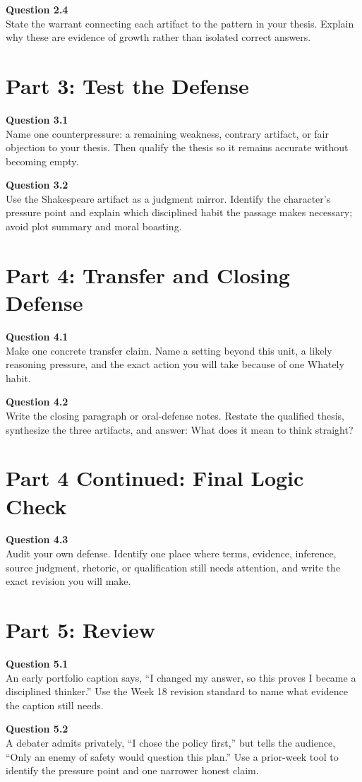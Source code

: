 \documentclass[12pt]{article}
\begin{document}
\textbf{Question 2.4}\\[-0.15em]
State the warrant connecting each artifact to the pattern in your thesis. Explain why these are evidence of growth rather than isolated correct answers.

\newpage
\section*{Part 3: Test the Defense}
\textbf{Question 3.1}\\[-0.15em]
Name one counterpressure: a remaining weakness, contrary artifact, or fair objection to your thesis. Then qualify the thesis so it remains accurate without becoming empty.

\textbf{Question 3.2}\\[-0.15em]
Use the Shakespeare artifact as a judgment mirror. Identify the character's pressure point and explain which disciplined habit the passage makes necessary; avoid plot summary and moral boasting.

\newpage
\section*{Part 4: Transfer and Closing Defense}
\textbf{Question 4.1}\\[-0.15em]
Make one concrete transfer claim. Name a setting beyond this unit, a likely reasoning pressure, and the exact action you will take because of one Whately habit.

\textbf{Question 4.2}\\[-0.15em]
Write the closing paragraph or oral-defense notes. Restate the qualified thesis, synthesize the three artifacts, and answer: What does it mean to think straight?

\newpage
\section*{Part 4 Continued: Final Logic Check}
\textbf{Question 4.3}\\[-0.15em]
Audit your own defense. Identify one place where terms, evidence, inference, source judgment, rhetoric, or qualification still needs attention, and write the exact revision you will make.

\newpage
\section*{Part 5: Review}
\textbf{Question 5.1}\\[-0.15em]
An early portfolio caption says, ``I changed my answer, so this proves I became a disciplined thinker.'' Use the Week 18 revision standard to name what evidence the caption still needs.

\textbf{Question 5.2}\\[-0.15em]
A debater admits privately, ``I chose the policy first,'' but tells the audience, ``Only an enemy of safety would question this plan.'' Use a prior-week tool to identify the pressure point and one narrower honest claim.
\end{document}
